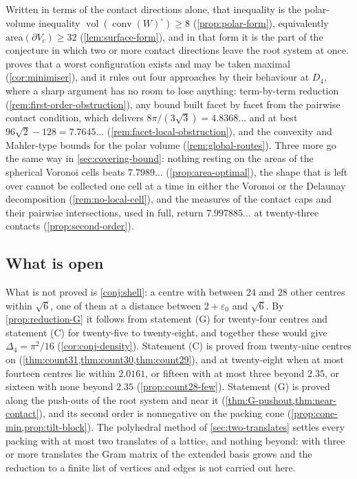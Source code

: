 \documentclass[11pt,reqno]{amsart}
\renewcommand{\_}{\origunderscore\allowbreak}
\numberwithin{equation}{section}
\theoremstyle{plain}
\theoremstyle{definition}
\theoremstyle{remark}
\DeclareMathOperator{\vol}{vol}
\DeclareMathOperator{\conv}{conv}
\begin{document}
Written in terms of the contact directions alone, that inequality is the
polar-volume inequality $\vol(\conv(W)^{\circ})\ge8$
(\cref{prop:polar-form}), equivalently $\mathrm{area}(\partial V_c)\ge32$
(\cref{lem:surface-form}), and in that form it is the part of the
conjecture in which two or more contact directions leave the root system at
once.  proves that a worst configuration exists and
may be taken maximal (\cref{cor:minimiser}), and it rules out four
approaches by their behaviour at $D_4$, where a sharp argument has no room
to lose anything: term-by-term reduction
(\cref{rem:first-order-obstruction}), any bound built facet by facet from
the pairwise contact condition, which delivers $8\pi/(3\sqrt3)=4.8368\ldots$
and at best $96\sqrt2-128=7.7645\ldots$
(\cref{rem:facet-local-obstruction}), and the convexity and Mahler-type
bounds for the polar volume (\cref{rem:global-routes}). Three more go the
same way in \cref{sec:covering-bound}: nothing resting on the areas of the
spherical Voronoi cells beats $7.7989\ldots$ (\cref{prop:area-optimal}), the
shape that is left over cannot be collected one cell at a time in either
the Voronoi or the Delaunay decomposition (\cref{rem:no-local-cell}), and
the measures of the contact caps and their pairwise intersections, used in
full, return $7.997885\ldots$ at twenty-three contacts
(\cref{prop:second-order}).

\subsection{What is open}

What is not proved is \cref{conj:shell}: a centre with between $24$ and $28$
other centres within $\sqrt6$, one of them at a distance between
$2+\varepsilon_0$ and $\sqrt6$. By \cref{prop:reduction-G} it follows from
statement (G) for twenty-four centres and statement (C) for twenty-five to
twenty-eight, and together these would give $\Delta_4=\pi^2/16$
(\cref{cor:conj-density}). Statement (C) is proved from twenty-nine centres on
(\cref{thm:count31,thm:count30,thm:count29}), and at twenty-eight when at most
fourteen centres lie within $2.0161$, or fifteen with at most three beyond
$2.35$, or sixteen with none beyond $2.35$ (\cref{prop:count28-few}).
Statement (G) is proved along the
push-outs of the root system and near it
(\cref{thm:G-pushout,thm:near-contact}), and its second order is
nonnegative on the packing cone (\cref{prop:cone-min,prop:tilt-block}).
The polyhedral method of \cref{sec:two-translates} settles every packing
with at most two translates of a lattice, and nothing beyond: with three or
more translates the Gram matrix of the extended basis grows and the
reduction to a finite list of vertices and edges is not carried out here.
\end{document}
